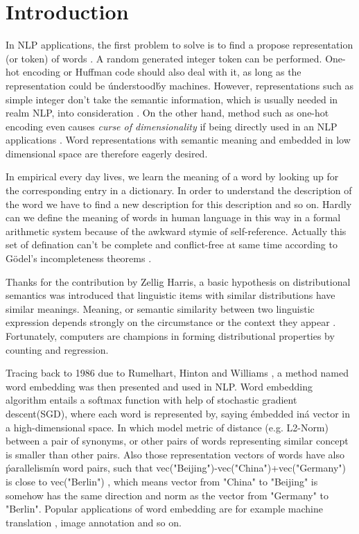 \section{Introduction}
In NLP applications, the first problem to solve is to find a propose representation (or token) of words \cite{schutze2008introduction}. A random generated integer token can be performed. One-hot encoding \cite{turian2010word} or Huffman code \cite{el2006compression} should also deal with it, as long as the representation could be \'understood\' by machines. However, representations such as simple integer don't take the semantic information, which is usually needed in realm NLP, into consideration \cite{le2014distributed}. On the other hand, method such as one-hot encoding even causes \textit{curse of dimensionality} if being directly used in an NLP applications \cite{bengio2003neural}. Word representations with semantic meaning and embedded in low dimensional space are therefore eagerly desired.

In empirical every day lives, we learn the meaning of a word by looking up for the corresponding entry in a dictionary. In order to understand the description of the word we have to find a new description for this description and so on. Hardly can we define the meaning of words in human language in this way in a formal arithmetic system because of the awkward stymie of self-reference. Actually this set of defination can't be complete and conflict-free at same time according to G{\"o}del's incompleteness theorems \cite{godel1931formal}.

Thanks for the contribution by Zellig Harris, a basic hypothesis on distributional semantics was introduced that linguistic items with similar distributions have similar meanings. Meaning, or semantic similarity between two linguistic expression depends strongly on the circumstance or the context they appear \cite{harris1954distributional}. Fortunately, computers are champions in forming distributional properties by counting and regression.

Tracing back to 1986 due to Rumelhart, Hinton and Williams \cite{williams1986learning}, a method named word embedding was then presented and used in NLP. Word embedding algorithm entails a softmax function with help of stochastic gradient descent(SGD), where each word is represented by, saying \'embedded in\' a vector in a high-dimensional space. In which model metric of distance (e.g. L2-Norm) between a pair of synonyms, or other pairs of words representing similar concept is smaller than other pairs. Also those representation vectors of words have also \'parallelism\' in word pairs, such that vec("Beijing")-vec("China")+vec("Germany") is close to vec("Berlin") \cite{le2014distributed}, which means vector from "China" to "Beijing" is somehow has the same direction and norm as the vector from "Germany" to "Berlin". Popular applications of word embedding are for example machine translation \cite{cho2014learning}, image annotation \cite{weston2011wsabie} and so on. 

